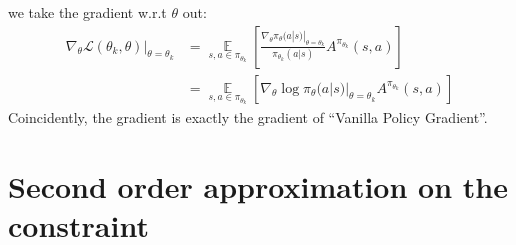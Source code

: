 \documentclass[a4paper, titlepage, 12pt]{article}
\begin{document}
we take the gradient w.r.t $\theta$ out:
\begin{equation}
    \begin{aligned}
    \nabla_{\theta} \mathcal{L}(\theta_{k}, \theta)|_{\theta = \theta_{k}} &= \mathop{\mathbb{E}} \limits_{s, a \in \pi_{\theta_{k}}} \left[ \frac{\nabla_{\theta} \pi_{\theta} (a | s) |_{\theta = \theta_{k}}}{\pi_{\theta_{k}} (a | s)} A^{\pi_{\theta_{k}}} (s, a) \right] \\
                                                                           &= \mathop{\mathbb{E}} \limits_{s, a \in \pi_{\theta_{k}}} \left[ \nabla_{\theta} \log \pi_{\theta} (a | s) |_{\theta = \theta_{k}} A^{\pi_{\theta_{k}}} (s, a) \right]
    \end{aligned}
\end{equation}
Coincidently, the gradient is exactly the gradient of ``Vanilla Policy Gradient''.

\section{Second order approximation on the constraint}
\end{document}
